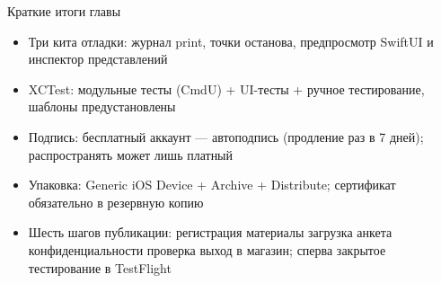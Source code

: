 \begin{tcbsummary}{Краткие итоги главы}
\begin{itemize}
  \item Три кита отладки: журнал print, точки останова, предпросмотр SwiftUI и инспектор представлений
  \item XCTest: модульные тесты (CmdU) + UI-тесты + ручное тестирование, шаблоны предустановлены
  \item Подпись: бесплатный аккаунт — автоподпись (продление раз в 7 дней); распространять может лишь платный
  \item Упаковка: Generic iOS Device + Archive + Distribute; сертификат обязательно в резервную копию
  \item Шесть шагов публикации: регистрация материалы загрузка анкета конфиденциальности проверка выход в магазин; сперва закрытое тестирование в TestFlight
\end{itemize}

\end{tcbsummary}

